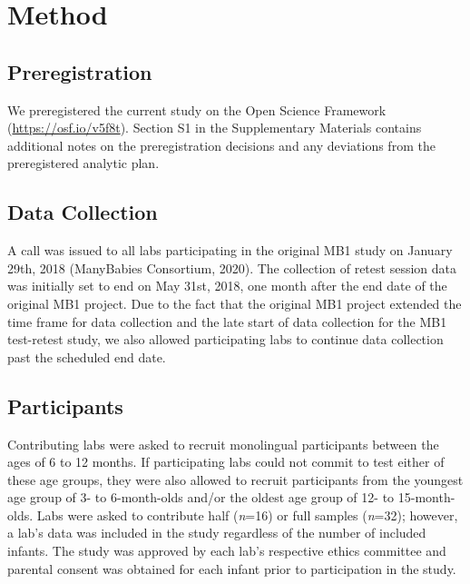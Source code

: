\documentclass[
  man,floatsintext]{apa6}
\begin{document}
\hypertarget{method}{%
\section{Method}\label{method}}

\hypertarget{preregistration}{%
\subsection{Preregistration}\label{preregistration}}

We preregistered the current study on the Open Science Framework (\url{https://osf.io/v5f8t}). Section S1 in the Supplementary Materials contains additional notes on the preregistration decisions and any deviations from the preregistered analytic plan.

\hypertarget{data-collection}{%
\subsection{Data Collection}\label{data-collection}}

A call was issued to all labs participating in the original MB1 study on January 29th, 2018 (ManyBabies Consortium, 2020). The collection of retest session data was initially set to end on May 31st, 2018, one month after the end date of the original MB1 project. Due to the fact that the original MB1 project extended the time frame for data collection and the late start of data collection for the MB1 test-retest study, we also allowed participating labs to continue data collection past the scheduled end date.

\hypertarget{participants}{%
\subsection{Participants}\label{participants}}

Contributing labs were asked to recruit monolingual participants between the ages of 6 to 12 months. If participating labs could not commit to test either of these age groups, they were also allowed to recruit participants from the youngest age group of 3- to 6-month-olds and/or the oldest age group of 12- to 15-month-olds.
Labs were asked to contribute half (\emph{n}=16) or full samples (\emph{n}=32); however, a lab's data was included in the study regardless of the number of included infants.
The study was approved by each lab's respective ethics committee and parental consent was obtained for each infant prior to participation in the study.
\end{document}
